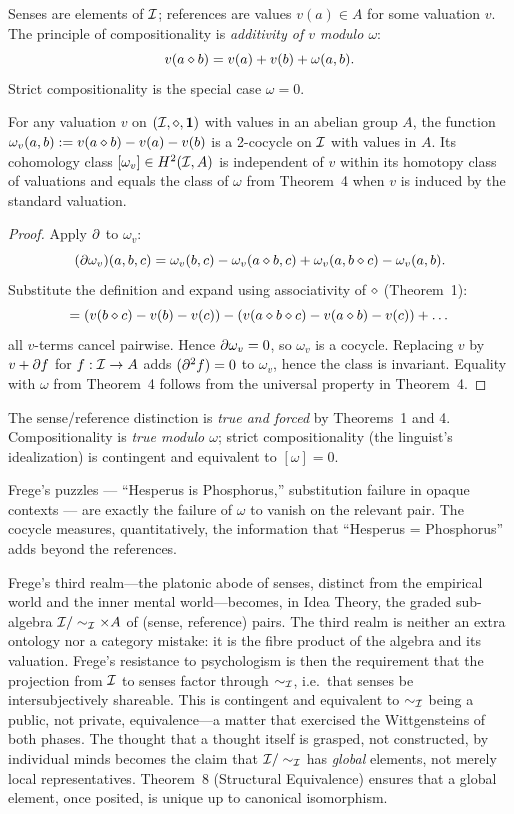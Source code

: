 \formalclaim Senses are elements of $\mathcal{I}$; references are values
$v(a)\in A$ for some valuation $v$. The principle of compositionality is
\emph{additivity of $v$ modulo $\omega$}:
\[
  v(a\mathbin{\diamond} b) = v(a) + v(b) + \omega(a,b).
\]
Strict compositionality is the special case $\omega = 0$.

\begin{lemma}\label{lem:frege}
For any valuation $v$ on $(\mathcal{I},\mathbin{\diamond},\mathbf{1})$ with values in an abelian group $A$,
the function $\omega_v(a,b)\mathrel{:=} v(a\mathbin{\diamond} b) - v(a) - v(b)$ is a
2-cocycle on $\mathcal{I}$ with values in $A$. Its cohomology class
$[\omega_v]\in H^2(\mathcal{I}, A)$ is independent of $v$ within its
homotopy class of valuations and equals the class of $\omega$ from
Theorem~4 when $v$ is induced by the standard valuation.
\end{lemma}

\begin{proof}
Apply $\partial$ to $\omega_v$:
\[
  (\partial\omega_v)(a,b,c) = \omega_v(b,c) - \omega_v(a\mathbin{\diamond} b, c)
   + \omega_v(a, b\mathbin{\diamond} c) - \omega_v(a, b).
\]
Substitute the definition and expand using associativity of $\mathbin{\diamond}$
(Theorem~1):
\[
  = (v(b\mathbin{\diamond} c) - v(b) - v(c)) - (v(a\mathbin{\diamond} b\mathbin{\diamond} c) -
     v(a\mathbin{\diamond} b) - v(c)) + \dots
\]
all $v$-terms cancel pairwise. Hence $\partial\omega_v = 0$, so $\omega_v$
is a cocycle. Replacing $v$ by $v+\partial f$ for $f:\mathcal{I}\to A$ adds
$(\partial^2 f) = 0$ to $\omega_v$, hence the class is invariant. Equality
with $\omega$ from Theorem~4 follows from the universal property in
Theorem~4.
\end{proof}

\formalstatus The sense/reference distinction is \emph{true and forced}
by Theorems~1 and 4. Compositionality is \emph{true modulo $\omega$};
strict compositionality (the linguist's idealization) is contingent and
equivalent to $[\omega] = 0$.

\litcomment Frege's puzzles --- ``Hesperus is Phosphorus,'' substitution
failure in opaque contexts --- are exactly the failure of $\omega$ to
vanish on the relevant pair. The cocycle measures, quantitatively, the
information that ``Hesperus = Phosphorus'' adds beyond the references.

Frege's third realm---the platonic abode of senses, distinct from the
empirical world and the inner mental world---becomes, in Idea Theory,
the graded sub-algebra
$\mathcal{I}/\sim_{\mathcal{I}} \times A$ of (sense, reference) pairs. The third
realm is neither an extra ontology nor a category mistake: it is the
fibre product of the algebra and its valuation. Frege's resistance to
psychologism is then the requirement that the projection from
$\mathcal{I}$ to senses factor through $\sim_{\mathcal{I}}$, i.e.\ that senses be
intersubjectively shareable. This is contingent and equivalent to
$\sim_{\mathcal{I}}$ being a public, not private, equivalence---a matter that
exercised the Wittgensteins of both phases. The thought that a thought
itself is grasped, not constructed, by individual minds becomes the
claim that $\mathcal{I}/\sim_{\mathcal{I}}$ has \emph{global} elements, not merely
local representatives. Theorem~8 (Structural Equivalence) ensures
that a global element, once posited, is unique up to canonical
isomorphism.

